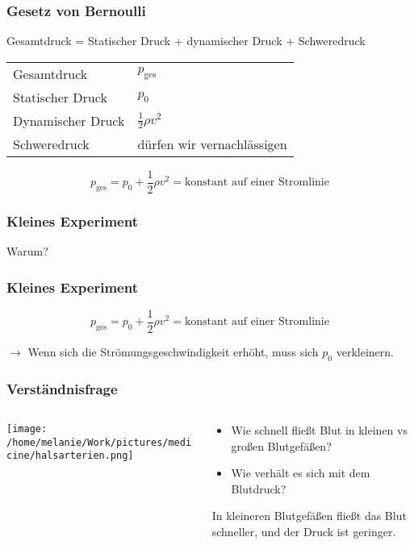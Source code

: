 \documentclass{beamer}
\begin{document}
\begin{frame}
\frametitle{Gesetz von Bernoulli}

Gesamtdruck = Statischer Druck + dynamischer Druck + Schweredruck \\[0.5 cm]


\begin{tabular}{ll}
Gesamtdruck     & \(p_{\text{ges}}\)     \\[0.2 cm]
Statischer Druck        & \(p_0\)     \\[0.2 cm]
Dynamischer Druck       & \(\frac{1}{2}\rho v^2\) \\[0.2 cm]
Schweredruck    & dürfen wir vernachlässigen \\[0.5 cm]
\end{tabular}

\pause

\[
p_{\text{ges}} = p_0 + \frac{1}{2}\rho v^2 = \text{konstant auf einer Stromlinie}
\]


\end{frame}

\begin{frame}
\frametitle{Kleines Experiment}

\pause

Warum? 

\end{frame}



\begin{frame}
\frametitle{Kleines Experiment}

\[
p_{\text{ges}} = p_0 + \frac{1}{2}\rho v^2 = \text{konstant auf einer Stromlinie}
\]

\(\rightarrow\) Wenn sich die Strömungsgeschwindigkeit erhöht, muss sich \(p_0\) verkleinern.
\end{frame}


\begin{frame}
\frametitle{Verständnisfrage}

\begin{columns}[c]
\begin{column}{5cm}
\begin{center}
\texttt{[image: /home/melanie/Work/pictures/medicine/halsarterien.png]}
\end{center}
\end{column}

\begin{column}{5cm}

\begin{itemize}
\item
Wie schnell flie{\ss}t Blut in kleinen vs gro{\ss}en Blutgefä{\ss}en?
\item
Wie verhält es sich mit dem Blutdruck?
\end{itemize}

\pause

In \textcolor{theme}{kleineren} Blutgefäßen fließt das Blut \textcolor{theme}{schneller}, und der Druck ist \textcolor{theme}{geringer}. 


\end{column}
\end{columns}


\end{frame}
\end{document}
